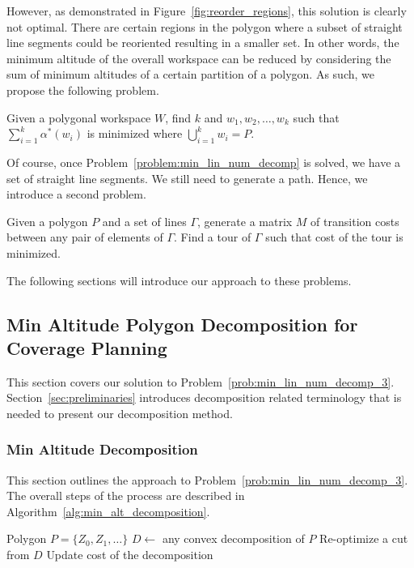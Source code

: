 \documentclass[../main.tex]{subfiles}
\begin{document}
However, as demonstrated in Figure~\ref{fig:reorder_regions}, this solution is clearly not optimal. There are certain regions in the polygon where a subset of straight line segments could be reoriented resulting in a smaller set. In other words, the minimum altitude of the overall workspace can be reduced by considering the sum of minimum altitudes of a certain partition of a polygon. As such, we propose the following problem.

\begin{problem}
\label{problem:min_lin_num_decomp}
Given a polygonal workspace $W$, find $k$ and $w_1,w_2,\ldots,w_k$ such that $\sum^k_{i=1}\alpha^*(w_i)$ is minimized where $\bigcup^k_{i=1}w_i=P$.
\end{problem}

Of course, once Problem~\ref{problem:min_lin_num_decomp} is solved, we have a set of straight line segments. We still need to generate a path. Hence, we introduce a second problem.

\begin{problem}
\label{problem:min_tour}
Given a polygon $P$ and a set of lines $\Gamma$, generate a matrix $M$ of transition costs between any pair of elements of $\Gamma$. Find a tour of $\Gamma$ such that cost of the tour is minimized.
\end{problem}

The following sections will introduce our approach to these problems.

\subsection{Min Altitude Polygon Decomposition for Coverage Planning}
\label{sec:decomposition}

This section covers our solution to Problem~\ref{prob:min_lin_num_decomp_3}. Section~\ref{sec:preliminaries} introduces decomposition related terminology that is needed to present our decomposition method.

\subsubsection{Min Altitude Decomposition}
This section outlines the approach to Problem~\ref{prob:min_lin_num_decomp_3}. The overall steps of the process are described in Algorithm~\ref{alg:min_alt_decomposition}.
\begin{algorithm}
	\caption{$\operatorname{min\_alt\_decomposition}(P)$}
	\label{alg:min_alt_decomposition}
	\begin{algorithmic}[1]
		\REQUIRE Polygon $P=\{Z_0,Z_1,\ldots\}$
			\STATE $D\gets$ any convex decomposition of $P$	\label{line:cvx_decomp}
			\REPEAT
				\STATE Re-optimize a cut from $D$ \label{line:opt_cut_2}
				\STATE Update cost of the decomposition \label{line:update_cost}
	\end{algorithmic}
\end{algorithm}
\end{document}
